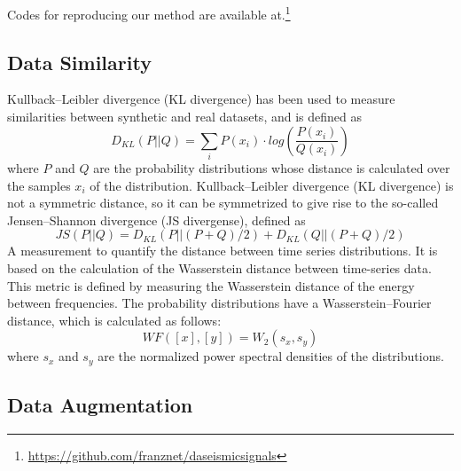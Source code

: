 \documentclass[journal]{IEEEtran}
\begin{document}
Codes for reproducing our method are available at.\footnote{\href{https://github.com/franznet/daseismicsignals}{\color{blue}https://github.com/franznet/daseismicsignals}}



\subsection{Data Similarity}
Kullback–Leibler divergence (KL divergence) has been used to measure similarities between synthetic and real datasets, and is defined as
\begin{equation}
D_{KL}(P||Q)=\sum_{i}P(x_i )\cdot log\left(\frac{P(x_i)}{Q(x_i)}\right)
\end{equation}
where $P$ and $Q$ are the probability distributions whose distance is calculated over the samples $x_i$  of the distribution\cite{iglesias2023data}. Kullback–Leibler divergence (KL divergence) is not a symmetric distance, so it can be symmetrized to give rise to the so-called Jensen–Shannon divergence (JS divergense), defined as
\begin{equation}
JS(P||Q)=D_{KL} (P||(P+Q)/2) +D_{KL}(Q||(P+Q)/2)
\end{equation}
A measurement to quantify the distance between time series distributions. It is based on the calculation of the Wasserstein distance between time-series data. This metric is defined by measuring the Wasserstein distance of the energy between frequencies. The probability distributions have a Wasserstein–Fourier distance, which is calculated as follows\cite{iglesias2023data}:
\begin{equation}
WF([x],[y])=W_2 (s_x,s_y)
\end{equation}
where $s_x$ and $s_y$ are the normalized power spectral densities of the distributions.


\subsection{Data Augmentation}
\end{document}
